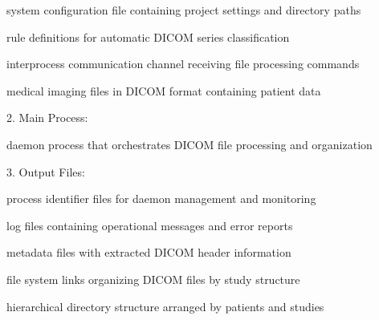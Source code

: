 \documentclass[letterpaper,10pt,english]{sphinxmanual}
\begin{document}
\begin{DUlineblock}{0em}
\item[] \sphinxhyphen{}  \sphinxhyphen{} system configuration file containing project settings and directory paths
\item[] \sphinxhyphen{}  \sphinxhyphen{} rule definitions for automatic DICOM series classification
\item[] \sphinxhyphen{}  \sphinxhyphen{} inter\sphinxhyphen{}process communication channel receiving file processing commands
\item[] \sphinxhyphen{}  \sphinxhyphen{} medical imaging files in DICOM format containing patient data
\end{DUlineblock}

\begin{DUlineblock}{0em}
\item[] 2. Main Process:
\end{DUlineblock}

\begin{DUlineblock}{0em}
\item[] \sphinxhyphen{}  \sphinxhyphen{} daemon process that orchestrates DICOM file processing and organization
\end{DUlineblock}

\begin{DUlineblock}{0em}
\item[] 3. Output Files:
\end{DUlineblock}

\begin{DUlineblock}{0em}
\item[] \sphinxhyphen{}  \sphinxhyphen{} process identifier files for daemon management and monitoring
\item[] \sphinxhyphen{}  \sphinxhyphen{} log files containing operational messages and error reports
\item[] \sphinxhyphen{}  \sphinxhyphen{} metadata files with extracted DICOM header information
\item[] \sphinxhyphen{}  \sphinxhyphen{} file system links organizing DICOM files by study structure
\item[] \sphinxhyphen{}  \sphinxhyphen{} hierarchical directory structure arranged by patients and studies
\end{DUlineblock}
\end{document}
